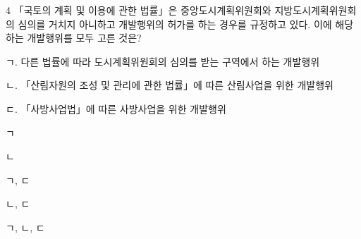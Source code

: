 \begin{question}{4}
「국토의 계획 및 이용에 관한 법률」은 중앙도시계획위원회와 지방도시계획위원회의 심의를 거치지 아니하고 개발행위의 허가를 하는 경우를 규정하고 있다. 이에 해당하는 개발행위를 모두 고른 것은?
\begin{framedtext}
ㄱ. 다른 법률에 따라 도시계획위원회의 심의를 받는 구역에서 하는 개발행위 \par
ㄴ. 「산림자원의 조성 및 관리에 관한 법률」에 따른 산림사업을 위한 개발행위 \par
ㄷ. 「사방사업법」에 따른 사방사업을 위한 개발행위 \par
\end{framedtext}
\begin{choices}
  \item ㄱ
  \item ㄴ
  \item ㄱ, ㄷ
  \item ㄴ, ㄷ
  \item ㄱ, ㄴ, ㄷ
\end{choices}
\end{question}
